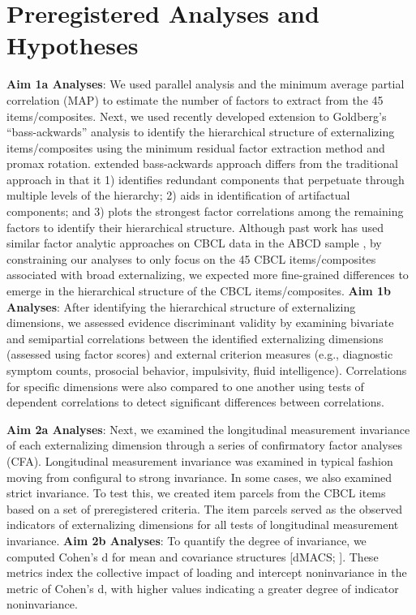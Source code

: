 \documentclass[
  20pt,
  number,
  preprint,
  3p,
  twocolumn]{elsarticle}
\begin{document}
\hypertarget{preregistered-analyses-and-hypotheses}{%
\section{Preregistered Analyses and
Hypotheses}\label{preregistered-analyses-and-hypotheses}}

\textbf{Aim 1a Analyses}: We used parallel analysis and the minimum
average partial correlation (MAP) to estimate the number of factors to
extract from the 45 items/composites. Next, we used \citep{forbes2023}
recently developed extension to Goldberg's ``bass-ackwards'' analysis
\citep{goldberg2006} to identify the hierarchical structure of
externalizing items/composites using the minimum residual factor
extraction method and promax rotation. \citep{forbes2023} extended
bass-ackwards approach differs from the traditional approach in that it
1) identifies redundant components that perpetuate through multiple
levels of the hierarchy; 2) aids in identification of artifactual
components; and 3) plots the strongest factor correlations among the
remaining factors to identify their hierarchical structure. Although
past work has used similar factor analytic approaches on CBCL data in
the ABCD sample \citep[e.g.,][]{michelini2019}, by constraining our
analyses to only focus on the 45 CBCL items/composites associated with
broad externalizing, we expected more fine-grained differences to emerge
in the hierarchical structure of the CBCL items/composites. \textbf{Aim
1b Analyses}: After identifying the hierarchical structure of
externalizing dimensions, we assessed evidence discriminant validity by
examining bivariate and semipartial correlations between the identified
externalizing dimensions (assessed using factor scores) and external
criterion measures (e.g., diagnostic symptom counts, prosocial behavior,
impulsivity, fluid intelligence). Correlations for specific dimensions
were also compared to one another using tests of dependent correlations
to detect significant differences between correlations.

\textbf{Aim 2a Analyses}: Next, we examined the longitudinal measurement
invariance of each externalizing dimension through a series of
confirmatory factor analyses (CFA). Longitudinal measurement invariance
was examined in typical fashion moving from configural to strong
invariance. In some cases, we also examined strict invariance. To test
this, we created item parcels from the CBCL items based on a set of
preregistered criteria. The item parcels served as the observed
indicators of externalizing dimensions for all tests of longitudinal
measurement invariance. \textbf{Aim 2b Analyses}: To quantify the degree
of invariance, we computed Cohen's d for mean and covariance structures
{[}dMACS; \citep{nye2011}{]}. These metrics index the collective impact
of loading and intercept noninvariance in the metric of Cohen's d, with
higher values indicating a greater degree of indicator noninvariance.
\end{document}
